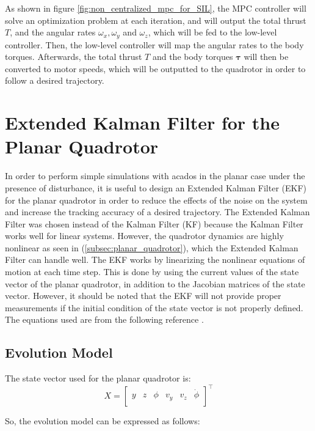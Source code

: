 \documentclass{thesisreport}
\begin{document}
As shown in figure \ref{fig:non_centralized_mpc_for_SIL}, the MPC controller will solve an optimization problem at each iteration, and will output the total thrust $T$, and the angular rates $\omega_x, \omega_y$ and $\omega_z$, which will be fed to the low-level controller. Then, the low-level controller will map the angular rates to the body torques. Afterwards, the total thrust $T$ and the body torques $\bm{\tau}$ will then be converted to motor speeds, which will be outputted to the quadrotor in order to follow a desired trajectory.

\section{Extended Kalman Filter for the Planar Quadrotor}
In order to perform simple simulations with acados in the planar case under the presence of disturbance, it is useful to design an Extended Kalman Filter (EKF) for the planar quadrotor in order to reduce the effects of the noise on the system and increase the tracking accuracy of a desired trajectory. The Extended Kalman Filter was chosen instead of the Kalman Filter (KF) because the Kalman Filter works well for linear systems. However, the quadrotor dynamics are highly  nonlinear as seen in (\ref{subsec:planar_quadrotor}), which the Extended Kalman Filter can handle well. The EKF works by linearizing the nonlinear equations of motion at each time step. This is done by using the current values of the state vector of the planar quadrotor, in addition to the Jacobian matrices of the state vector. However, it should be noted that the EKF will not provide proper measurements if the initial condition of the state vector is not properly defined. The equations used are from the following reference \cite{AUVE2020}.

\subsection{Evolution Model}

The state vector used for the planar quadrotor is: 
\begin{equation}\label{planar_drone_states}
	X = \begin{bmatrix}
		y & z & \phi & v_y & v_z & \dot{\phi} \\ 
	\end{bmatrix}^{\intercal}
\end{equation}

So, the evolution model can be expressed as follows: 
\end{document}
